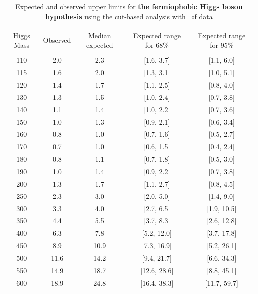 \begin{table}[!hbp]
\begin{center}
\begin{tabular}{c c c c c}
\hline
\vspace{-3mm} && \\
 Higgs Mass   & Observed & Median expected & Expected range for 68\% & Expected range for 95\%   \\
\vspace{-3mm} && \\
\hline
110 & 2.0 & 2.3 & [1.6, 3.7] & [1.1, 6.0] \\
115 & 1.6 & 2.0 & [1.3, 3.1] & [1.0, 5.1] \\
120 & 1.4 & 1.7 & [1.1, 2.5] & [0.8, 4.0] \\
130 & 1.3 & 1.5 & [1.0, 2.4] & [0.7, 3.8] \\
140 & 1.1 & 1.4 & [1.0, 2.2] & [0.7, 3.6] \\
150 & 1.0 & 1.3 & [0.9, 2.1] & [0.6, 3.4] \\
160 & 0.8 & 1.0 & [0.7, 1.6] & [0.5, 2.7] \\
170 & 0.7 & 1.0 & [0.6, 1.5] & [0.4, 2.4] \\
180 & 0.8 & 1.1 & [0.7, 1.8] & [0.5, 3.0] \\
190 & 1.0 & 1.4 & [0.9, 2.2] & [0.7, 3.8] \\
200 & 1.3 & 1.7 & [1.1, 2.7] & [0.8, 4.5] \\
250 & 2.3 & 3.0 & [2.0, 5.0] & [1.4, 9.0] \\
300 & 3.3 & 4.0 & [2.7, 6.5] & [1.9, 10.5] \\
350 & 4.4 & 5.5 & [3.7, 8.3] & [2.6, 12.8] \\
400 & 6.3 & 7.8 & [5.2, 12.0] & [3.7, 17.8] \\
450 & 8.9 & 10.9 & [7.3, 16.9] & [5.2, 26.1] \\
500 & 11.6 & 14.2 & [9.4, 21.7] & [6.6, 34.3] \\
550 & 14.9 & 18.7 & [12.6, 28.6] & [8.8, 45.1] \\
600 & 18.9 & 24.8 & [16.4, 38.3] & [11.7, 59.7] \\
\hline
\end{tabular}
\caption{Expected and observed upper limits for {\bf the fermiophobic
    Higgs boson hypothesis} using the cut-based analysis with
  \intlumi\ of data}
\label{tab:cutbase_uls_fp}
\end{center}
\end{table}

